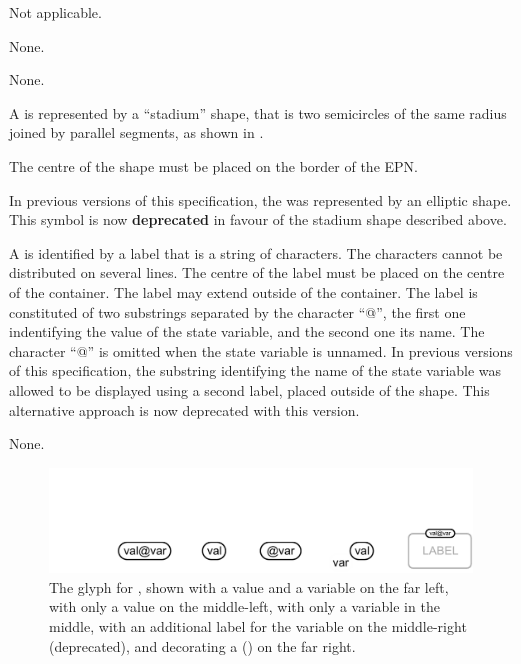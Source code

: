 \begin{glyphDescription}

\glyphSboTerm
Not applicable.

\glyphIncoming
None.

\glyphOutgoing
None.

\glyphContainer
A  is represented by a ``stadium'' shape, that is two semicircles of the same radius joined by parallel segments, as shown in .

The centre of the shape must be placed on the border of the EPN.

In previous versions of this specification, the  was represented by an elliptic shape.
This symbol is now \textbf{deprecated} in favour of the stadium shape described above.

\glyphLabel
A  is identified by a label that is a string of characters.
The characters cannot be distributed on several lines.
The centre of the label must be placed on the centre of the container.
The label may extend outside of the container.
The label is constituted of two substrings separated by the character ``@'', the first one indentifying the value of the state variable, and the second one its name.
The character ``@'' is omitted when the state variable is unnamed.
In previous versions of this specification, the substring identifying the name of the state variable was allowed to be displayed using a second label, placed outside of the shape. This alternative approach is now deprecated with this version.

\glyphAux
None.

\end{glyphDescription}

\begin{figure}[H]
  \centering
  \includegraphics[width=1.0\textwidth]{images/build/state_variable.pdf}
  \caption{The \PD glyph for , shown with a value and a variable on the far left, with only a value on the middle-left, with only a variable in the middle, with an additional label for the variable on the middle-right (deprecated), and decorating a  () on the far right.}
  \label{fig:state-var}
\end{figure}

